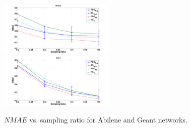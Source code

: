 \begin{figure}
  \begin{center}
    {\includegraphics[keepaspectratio, width=0.49\textwidth]{AbilenePSOTMC.png}} \\
    {\includegraphics[keepaspectratio, width=0.49\textwidth]{GeantPSOTMC.png}}
  \caption{{{$NMAE$ vs. sampling ratio for Abilene and Geant networks.}}}
  \label{fig:AbileneGeantPSOTMC}
  \end{center}
\end{figure}
